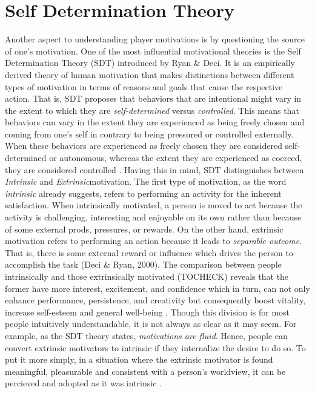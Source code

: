 \section{Self Determination Theory}
Another aspect to understanding player motivations is by questioning the source of one's motivation. One of the most influential motivational theories is the Self Determination Theory (SDT) introduced by Ryan \& Deci. It is an empirically derived theory of human motivation that makes distinctions between different types of motivation in terms of reasons and goals that cause the respective action. That is, SDT proposes that behaviors that are intentional might vary in the extent to which they are \textit{self-determined} versus \textit{controlled}. This means that behaviors can vary in the extent they are experienced as being freely chosen and coming from one's self in contrary to being pressured or controlled externally. When these behaviors are experienced as freely chosen they are considered self-determined or autonomous, whereas the extent they are experienced as coerced, they are considered controlled \cite{deci1994promoting}. Having this in mind, SDT distinguishes between \textit{Intrinsic} and \textit{Extrinsic}motivation. The first type of motivation, as the word \textit{intrinsic} already suggests, refers to performing an activity for the inherent satisfaction. When intrinsically motivated, a person is moved to act because the activity is challenging, interesting and enjoyable on its own rather than because of some external prods, pressures, or rewards. On the other hand, extrinsic motivation refers to performing an action because it leads to \textit{separable outcome}. That is, there is some external reward or influence which drives the person to accomplish the task (Deci  \& Ryan, 2000). The comparison between people intrinsically and those extrinsically motivated (TOCHECK) reveals that the former have more interest, excitement, and confidence which in turn, can not only enhance performance, persistence, and creativity but consequently boost vitality, increase self-esteem and general well-being \cite{ryan2000self}. Though this division is for most people intuitively understandable, it is not always as clear as it may seem. For example, as the SDT theory states, \textit{motivations are fluid}. Hence, people can convert extrinsic motivators to intrinsic if they internalize the desire to do so. To put it more simply, in a situation where the extrinsic motivator is found meaningful, pleasurable and consistent with a person’s worldview, it can be percieved and adopted as it was intrinsic \cite{zichermann2012}.
